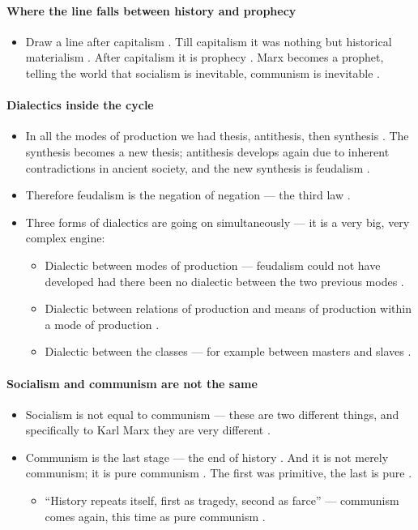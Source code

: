 \paragraph{Where the line falls between history and prophecy}
\begin{itemize}
    \item Draw a line after capitalism . Till capitalism it was nothing but historical materialism . After capitalism it is prophecy . Marx becomes a prophet, telling the world that socialism is inevitable, communism is inevitable .
\end{itemize}

\paragraph{Dialectics inside the cycle}
\begin{itemize}
    \item In all the modes of production we had thesis, antithesis, then synthesis . The synthesis becomes a new thesis; antithesis develops again due to inherent contradictions in ancient society, and the new synthesis is feudalism .
    \item Therefore feudalism is the negation of negation --- the third law .
    \item Three forms of dialectics are going on simultaneously --- it is a very big, very complex engine:
    \begin{itemize}
        \item Dialectic between modes of production --- feudalism could not have developed had there been no dialectic between the two previous modes .
        \item Dialectic between relations of production and means of production within a mode of production .
        \item Dialectic between the classes --- for example between masters and slaves .
    \end{itemize}
\end{itemize}

\paragraph{Socialism and communism are not the same}
\begin{itemize}
    \item Socialism is not equal to communism --- these are two different things, and specifically to Karl Marx they are very different .
    \item Communism is the last stage --- the end of history . And it is not merely communism; it is pure communism . The first was primitive, the last is pure .
    \begin{itemize}
        \item ``History repeats itself, first as tragedy, second as farce'' --- communism comes again, this time as pure communism .
    \end{itemize}
\end{itemize}


